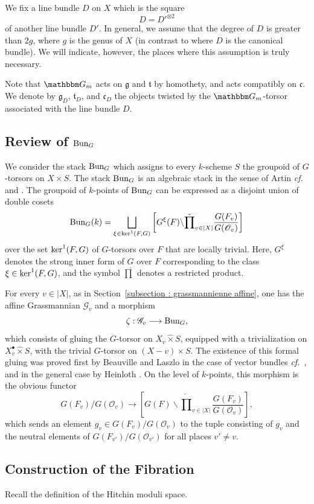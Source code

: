 \documentclass[12pt,english]{smfart}
\numberwithin{equation}{subsection}
\theoremstyle{remark}
\newcommand\calO{{\mathscr O}}
\newcommand\calQ{{\mathscr G}} %
\newcommand\calG{{\mathscr G}}
\newcommand\frakg{{\mathfrak g}}
\newcommand\frakt{{\mathfrak t}}
\newcommand\frakc{{\mathfrak c}}
\newcommand\GG{{\mathbbm G}}
\newcommand\cf{{\it cf.\ }}
\begin{document}
We fix a line bundle $D$ on $X$ which is the square
$$D={D'}^{\otimes 2}$$
of another line bundle $D'$. In general, we assume that the degree of $D$ is greater than $2g$, where $g$ is the genus of $X$ (in contrast to \cite{H} where $D$ is the canonical bundle). We will indicate, however, the places where this assumption is truly necessary.

Note that $\GG_m$ acts on $\frakg$ and $\frakt$ by homothety, and acts compatibly on $\frakc$. We denote by $\frakg_D$, $\frakt_D$, and $\frakc_D$ the objects twisted by the $\GG_{m}$-torsor associated with the line bundle $D$.

\subsection{Review of ${\rm Bun}_G$}

We consider the stack ${\rm Bun}_G$ which assigns to every $k$-scheme $S$ the groupoid of $G$-torsors on $X\times S$. The stack ${\rm Bun}_G$ is an algebraic stack in the sense of Artin \cf \cite{L-MR} and \cite[Prop.~1]{Heinloth}. The groupoid of $k$-points of ${\rm Bun}_G$ can be expressed as a disjoint union of double cosets
$${\rm Bun}_G(k)=\bigsqcup_{\xi\in {\rm ker}^1(F,G)}
\left[G^\xi(F)\backslash \check\prod_{v\in |X|} \frac{G(F_v)}{G(\calO_v)}\right]
$$
over the set ${\rm ker}^1(F,G)$ of $G$-torsors over $F$ that are locally trivial. Here, $G^\xi$ denotes the strong inner form of $G$ over $F$ corresponding to the class $\xi\in{\rm ker}^1(F,G)$, and the symbol $\check\prod$ denotes a restricted product.

For every $v\in |X|$, as in Section~\ref{subsection : grassmannienne affine}, one has the affine Grassmannian $\calQ_v$ and a morphism
$$\zeta:\calQ_v\longrightarrow {\rm Bun}_G,$$
which consists of gluing the $G$-torsor on $X_v\hat\times S$, equipped with a trivialization on $X_v^\bullet\hat\times S$, with the trivial $G$-torsor on $(X-v)\times S$. The existence of this formal gluing was proved first by Beauville and Laszlo in the case of vector bundles \cf \cite{BL}, and in the general case by Heinloth \cite[Lem.~5]{Heinloth}. On the level of $k$-points, this morphism is the obvious functor
$$G(F_v)/G(\calO_v) \longrightarrow
\left[G(F)\backslash \check\prod_{v\in |X|} \frac{G(F_v)}{G(\calO_v)}\right],
$$
which sends an element $g_v\in G(F_v)/G(\calO_v)$ to the tuple consisting of $g_v$ and the neutral elements of $G(F_{v'})/G(\calO_{v'})$ for all places $v'\neq v$.

\subsection{Construction of the Fibration}\label{Fibration of Hitchin}
Recall the definition of the Hitchin moduli space.
\end{document}
